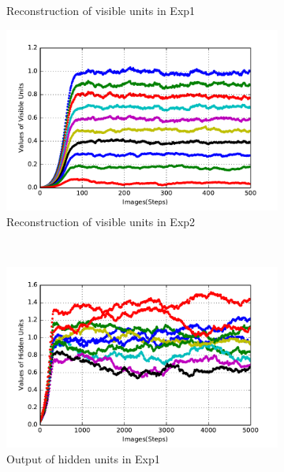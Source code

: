 \begin{figure}
\begin{subfigure}[t]{0.4\textwidth}
		\caption{Reconstruction of visible units in Exp1}
	\end{subfigure}
	\begin{subfigure}[t]{0.4\textwidth}
		\includegraphics[width=\textwidth]{pics_sdlm/30_exp_RBM/exp2_recon_non.pdf}
		\caption{Reconstruction of visible units in Exp2}
	\end{subfigure}\\
	\begin{subfigure}[t]{0.4\textwidth}
		\includegraphics[width=\textwidth]{pics_sdlm/30_exp_RBM/exp1_hid_non.pdf}
		\caption{Output of hidden units in Exp1}
	\end{subfigure}
	\begin{subfigure}[t]{0.4\textwidth}

\end{subfigure}
\end{figure}
